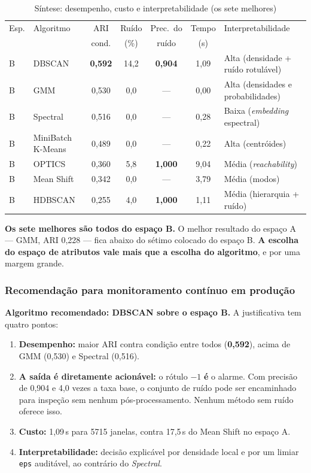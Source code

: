 \documentclass[12pt,a4paper]{article}
\begin{document}
\begin{table}[H]
\centering
\caption{Síntese: desempenho, custo e interpretabilidade (os sete melhores)}
\label{tab:sintese}
\begin{tabular}{llccccl}
\toprule
Esp. & Algoritmo & ARI & Ruído & Prec.\ do & Tempo & Interpretabilidade \\
     &           & cond. & (\%) & ruído & (s) & \\
\midrule
B & DBSCAN            & \textbf{0{,}592} & 14{,}2 & \textbf{0{,}904} & 1{,}09 & Alta (densidade + ruído rotulável) \\
B & GMM               & 0{,}530 & 0{,}0  & ---     & 0{,}00 & Alta (densidades e probabilidades) \\
B & Spectral          & 0{,}516 & 0{,}0  & ---     & 0{,}28 & Baixa (\emph{embedding} espectral) \\
B & MiniBatch K-Means & 0{,}489 & 0{,}0  & ---     & 0{,}22 & Alta (centróides) \\
B & OPTICS            & 0{,}360 & 5{,}8  & \textbf{1{,}000} & 9{,}04 & Média (\emph{reachability}) \\
B & Mean Shift        & 0{,}342 & 0{,}0  & ---     & 3{,}79 & Média (modos) \\
B & HDBSCAN           & 0{,}255 & 4{,}0  & \textbf{1{,}000} & 1{,}11 & Média (hierarquia + ruído) \\
\bottomrule
\end{tabular}
\end{table}

\noindent \textbf{Os sete melhores são todos do espaço B.} O melhor resultado do espaço A --- GMM, ARI 0,228 --- fica abaixo do sétimo colocado do espaço B. \textbf{A escolha do espaço de atributos vale mais que a escolha do algoritmo}, e por uma margem grande.

\subsubsection*{Recomendação para monitoramento contínuo em produção}

\textbf{Algoritmo recomendado: DBSCAN sobre o espaço B.} A justificativa tem quatro pontos:

\begin{enumerate}[nosep]
    \item \textbf{Desempenho:} maior ARI contra condição entre todos (\textbf{0,592}), acima de GMM (0,530) e Spectral (0,516).
    \item \textbf{A saída é diretamente acionável:} o rótulo $-1$ \textbf{é} o alarme. Com precisão de 0,904 e 4,0 vezes a taxa base, o conjunto de ruído pode ser encaminhado para inspeção sem nenhum pós-processamento. Nenhum método sem ruído oferece isso.
    \item \textbf{Custo:} 1,09\,s para 5715 janelas, contra 17,5\,s do Mean Shift no espaço A.
    \item \textbf{Interpretabilidade:} decisão explicável por densidade local e por um limiar \texttt{eps} auditável, ao contrário do \emph{Spectral}.
\end{enumerate}
\end{document}
